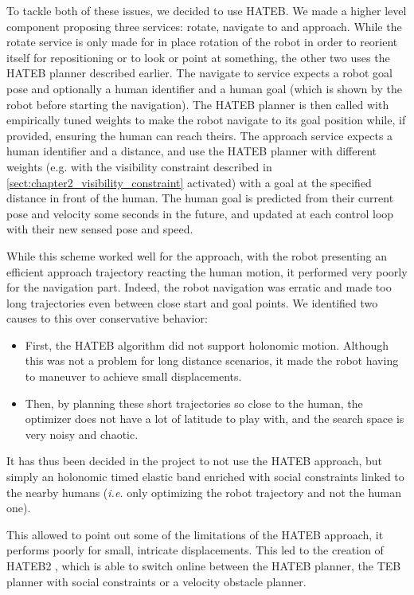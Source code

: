 \documentclass[a4paper,11pt,twoside]{StyleThese}
\begin{document}
To tackle both of these issues, we decided to use HATEB. We made a higher level component proposing three services: rotate, navigate to and approach. While the rotate service is only made for in place rotation of the robot in order to reorient itself for repositioning or to look or point at something, the other two uses the HATEB planner described earlier. The navigate to service expects a robot goal pose and optionally a human identifier and a human goal (which is shown by the robot before starting the navigation). The HATEB planner is then called with empirically tuned weights to make the robot navigate to its goal position while, if provided, ensuring the human can reach theirs. The approach service expects a human identifier and a distance, and use the HATEB planner with different weights (e.g. with the visibility constraint described in \ref{sect:chapter2_visibility_constraint} activated) with a goal at the specified distance in front of the human. The human goal is predicted from their current pose and velocity some seconds in the future, and updated at each control loop with their new sensed pose and speed.

While this scheme worked well for the approach, with the robot presenting an efficient approach trajectory reacting the human motion, it performed very poorly for the navigation part. Indeed, the robot navigation was erratic and made too long trajectories even between close start and goal points. We identified two causes to this over conservative behavior:

\begin{itemize}
\item First, the HATEB algorithm did not support holonomic motion. Although this was not a problem for long distance scenarios, it made the robot having to maneuver to achieve small displacements.

\item Then, by planning these short trajectories so close to the human, the optimizer does not have a lot of latitude to play with, and the search space is very noisy and chaotic.
\end{itemize}

It has thus been decided in the project to not use the HATEB approach, but simply an holonomic timed elastic band enriched with social constraints linked to the nearby humans (\textit{i.e.} only optimizing the robot trajectory and not the human one).

This allowed to point out some of the limitations of the HATEB approach, it performs poorly for small, intricate displacements. This led to the creation of HATEB2 \cite{teja_hateb2_2020}, which is able to switch online between the HATEB planner, the TEB planner with social constraints or a velocity obstacle planner.
\end{document}
